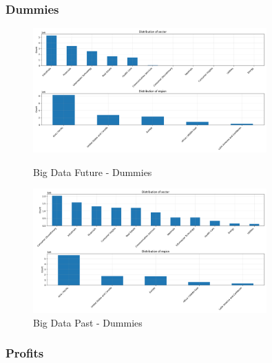 \documentclass[11pt,english,a4paper,hidelinks]{book}
\begin{document}
\subsubsection{Dummies}

\begin{figure}[H]
    \centering
    \begin{minipage}{0.48\textwidth}
        \centering
        \includegraphics[width=0.8\textwidth]{images/code/descriptive analysis/distributions/Big Data future - Dummies.png}
    \caption{Big Data Future - Dummies}
    \label{fig:future_dummies}
    \end{minipage}\hfill
    \begin{minipage}{0.48\textwidth}
        \centering
        \includegraphics[width=0.8\textwidth]{images/code/descriptive analysis/distributions/Big Data past - Dummies.png}
        \caption{Big Data Past - Dummies}
        \label{fig:past_dummies}
    \end{minipage}
\end{figure}

\subsubsection{Profits}
\end{document}
